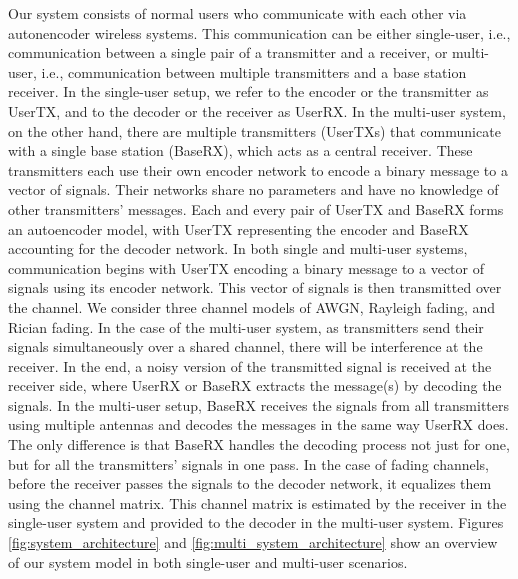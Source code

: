 Our system consists of normal users who communicate with each other via autonencoder wireless systems. This communication can be either single-user, i.e., communication between a single pair of a transmitter and a receiver, or multi-user, i.e., communication between multiple transmitters and a base station receiver. In the single-user setup, we refer to the encoder or the transmitter as UserTX, and to the decoder or the receiver as UserRX. In the multi-user system, on the other hand, there are multiple transmitters (UserTXs) that communicate with a single base station (BaseRX), which acts as a central receiver. These transmitters each use their own encoder network to encode a binary message to a vector of signals. Their networks share no parameters and have no knowledge of other transmitters' messages. Each and every pair of UserTX and BaseRX forms an autoencoder model, with UserTX representing the encoder and BaseRX accounting for the decoder network.
In both single and multi-user systems, communication begins with UserTX encoding a binary message to a vector of signals using its encoder network. This vector of signals is then transmitted over the channel. We consider three channel models of AWGN, Rayleigh fading, and Rician fading. In the case of the multi-user system, as transmitters send their signals simultaneously over a shared channel, there will be interference at the receiver. In the end, a noisy version of the transmitted signal is received at the receiver side, where UserRX or BaseRX extracts the message(s) by decoding the signals. In the multi-user setup, BaseRX receives the signals from all transmitters using multiple antennas and decodes the messages in the same way UserRX does. The only difference is that BaseRX handles the decoding process not just for one, but for all the transmitters' signals in one pass.
In the case of fading channels, before the receiver passes the signals to the decoder network, it equalizes them using the channel matrix. This channel matrix is estimated by the receiver in the single-user system and provided to the decoder in the multi-user system. Figures \ref{fig:system_architecture} and \ref{fig:multi_system_architecture} show an overview of our system model in both single-user and multi-user scenarios.

